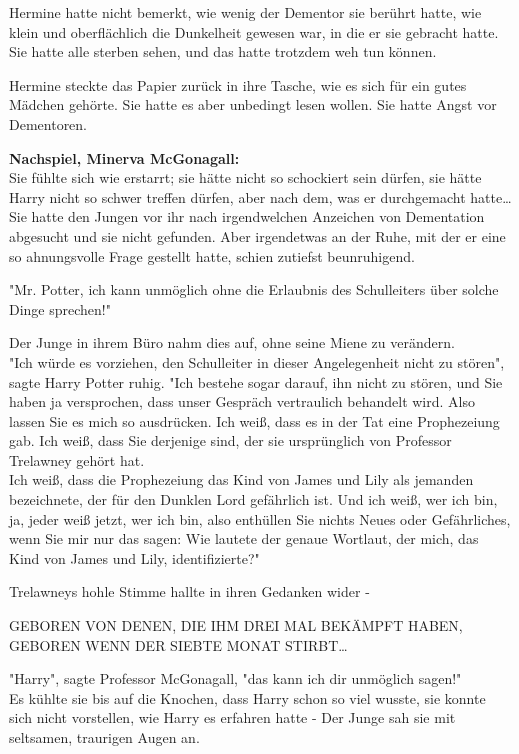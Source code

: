{Hermine hatte nicht bemerkt, wie wenig der Dementor sie berührt hatte, wie klein und oberflächlich die Dunkelheit gewesen war, in die er sie gebracht hatte. Sie hatte alle sterben sehen, und das hatte trotzdem weh tun können.

Hermine steckte das Papier zurück in ihre Tasche, wie es sich für ein gutes Mädchen gehörte. Sie hatte es aber unbedingt lesen wollen. Sie hatte Angst vor Dementoren.

\textbf{Nachspiel, Minerva McGonagall:}\\ Sie fühlte sich wie erstarrt; sie hätte nicht so schockiert sein dürfen, sie hätte Harry nicht so schwer treffen dürfen, aber nach dem, was er durchgemacht hatte… Sie hatte den Jungen vor ihr nach irgendwelchen Anzeichen von Dementation abgesucht und sie nicht gefunden. Aber irgendetwas an der Ruhe, mit der er eine so ahnungsvolle Frage gestellt hatte, schien zutiefst beunruhigend.

"Mr. Potter, ich kann unmöglich ohne die Erlaubnis des Schulleiters über solche Dinge sprechen!"

Der Junge in ihrem Büro nahm dies auf, ohne seine Miene zu verändern.\\ "Ich würde es vorziehen, den Schulleiter in dieser Angelegenheit nicht zu stören", sagte Harry Potter ruhig. "Ich bestehe sogar darauf, ihn nicht zu stören, und Sie haben ja versprochen, dass unser Gespräch vertraulich behandelt wird. Also lassen Sie es mich so ausdrücken. Ich weiß, dass es in der Tat eine Prophezeiung gab. Ich weiß, dass Sie derjenige sind, der sie ursprünglich von Professor Trelawney gehört hat.\\ Ich weiß, dass die Prophezeiung das Kind von James und Lily als jemanden bezeichnete, der für den Dunklen Lord gefährlich ist. Und ich weiß, wer ich bin, ja, jeder weiß jetzt, wer ich bin, also enthüllen Sie nichts Neues oder Gefährliches, wenn Sie mir nur das sagen: Wie lautete der genaue Wortlaut, der mich, das Kind von James und Lily, identifizierte?"

Trelawneys hohle Stimme hallte in ihren Gedanken wider -

GEBOREN VON DENEN, DIE IHM DREI MAL BEKÄMPFT HABEN, GEBOREN WENN DER SIEBTE MONAT STIRBT…

"Harry", sagte Professor McGonagall, "das kann ich dir unmöglich sagen!"\\ Es kühlte sie bis auf die Knochen, dass Harry schon so viel wusste, sie konnte sich nicht vorstellen, wie Harry es erfahren hatte - Der Junge sah sie mit seltsamen, traurigen Augen an.

}
